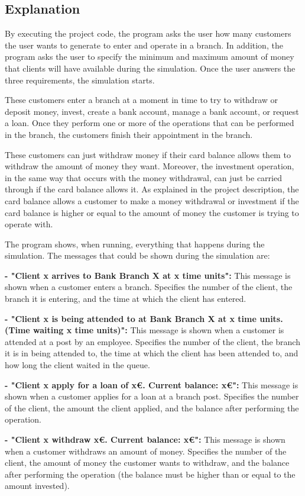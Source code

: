 \documentclass[titlepage, 12pt]{article}
\begin{document}
\subsection{Explanation}
By executing the project code, the program asks the user how many customers the user wants to generate to enter and operate in a branch. In addition, the program asks the user to specify the minimum and maximum amount of money that clients will have available during the simulation. Once the user answers the three requirements, the simulation starts.

These customers enter a branch at a moment in time to try to withdraw or deposit money, invest, create a bank account, manage a bank account, or request a loan. Once they perform one or more of the operations that can be performed in the branch, the customers finish their appointment in the branch.

These customers can just withdraw money if their card balance allows them to withdraw the amount of money they want. Moreover, the investment operation, in the same way that occurs with the money withdrawal, can just be carried through if the card balance allows it. As explained in the project description, the card balance allows a customer to make a money withdrawal or investment if the card balance is higher or equal to the amount of money the customer is trying to operate with.

The program shows, when running, everything that happens during the simulation. The messages that could be shown during the simulation are:

\textbf{- "Client x arrives to Bank Branch X at x time units":} This message is shown when a customer enters a branch. Specifies the number of the client, the branch it is entering, and the time at which the client has entered.

\textbf{- "Client x is being attended to at Bank Branch X at x time units. (Time waiting x time units)":} This message is shown when a customer is attended at a post by an employee. Specifies the number of the client, the branch it is in being attended to, the time at which the client has been attended to, and how long the client waited in the queue.

\textbf{- "Client x apply for a loan of x€. Current balance: x€":} This message is shown when a customer applies for a loan at a branch post. Specifies the number of the client, the amount the client applied, and the balance after performing the operation.

\textbf{- "Client x withdraw x€. Current balance: x€":} This message is shown when a customer withdraws an amount of money. Specifies the number of the client, the amount of money the customer wants to withdraw, and the balance after performing the operation (the balance must be higher than or equal to the amount invested).
\end{document}

